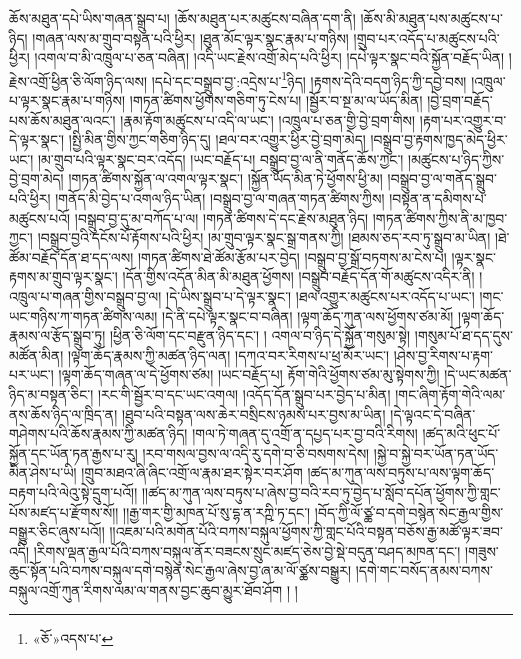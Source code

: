 ཆོས་མཐུན་དཔེ་ཡིས་གཞན་སྒྲུབ་པ། །ཆོས་མཐུན་པར་མཚུངས་བཞིན་དག་ནི། །ཆོས་མི་མཐུན་པས་མཚུངས་པ་ཉིད། །གཞན་ལས་མ་གྲུབ་བསྟན་པའི་ཕྱིར། །ཐུན་མོང་ལྟར་སྣང་རྣམ་པ་གཉིས། །གྲུབ་པར་འདོད་པ་མཚུངས་པའི་ཕྱིར། །འགལ་བ་མི་འཁྲུལ་པ་ཅན་བཞིན། །འདི་ཡང་རྗེས་འགྲོ་མེད་པའི་ཕྱིར། །དཔེ་ལྟར་སྣང་བའི་སྐྱོན་བརྗོད་ཡིན། །རྗེས་འགྲོ་ཕྱིན་ཅི་ལོག་ཉིད་ལས། །དཔེ་དང་བསྒྲུབ་བྱ་:འདྲེས་པ་\footnote{«ཅོ་»འདས་པ་}ཉིད། །རྟགས་དེའི་བདག་ཉིད་ཀྱི་དབྱེ་བས། །འཁྲུལ་པ་ལྟར་སྣང་རྣམ་པ་གཉིས། །གཏན་ཚིགས་ཕྱོགས་གཅིག་ཏུ་ངེས་པ། །སྦྱོར་བ་སྔ་མ་ལ་ཡོད་མིན། །བྱེ་བྲག་བརྗོད་པས་ཆོས་མཐུན་ལའང་། །རྣམ་རྟོག་མཚུངས་པ་འདི་ལ་ཡང་། །འཁྲུལ་པ་ཅན་གྱི་བྱེ་བྲག་གིས། །རྟག་པར་འགྱུར་བ་དེ་ལྟར་སྣང་། །སྤྱི་མིན་གྱིས་ཀྱང་གཅིག་ཉིད་དུ། །ཐལ་བར་འགྱུར་ཕྱིར་བྱེ་བྲག་མེད། །བསྒྲུབ་བྱ་རྟགས་ཁྱད་མེད་ཕྱིར་ཡང་། །མ་གྲུབ་པའི་ལྟར་སྣང་བར་འདོད། །ཡང་བརྗོད་པ། བསྒྲུབ་བྱ་ལ་ནི་གནོད་ཆོས་ཀྱང་། །མཚུངས་པ་ཉིད་ཀྱིས་བྱེ་བྲག་མེད། །གཏན་ཚིགས་སྐྱོན་ལ་འགལ་ལྟར་སྣང་། །སྐྱོན་ཡོད་མིན་ཏེ་ཕྱོགས་ཕྱི་མ། །བསྒྲུབ་བྱ་ལ་གནོད་སྒྲུབ་པའི་ཕྱིར། །གནོད་མི་བྱེད་པ་འགལ་ཉིད་ཡིན། །བསྒྲུབ་བྱ་ལ་གཞན་གཏན་ཚིགས་ཀྱིས། །བསྟན་ན་དམིགས་པ་མཚུངས་པའོ། །བསྒྲུབ་བྱ་དུ་མ་བཀོད་པ་ལ། །གཏན་ཚིགས་དེ་དང་རྗེས་མཐུན་ཉིད། །གཏན་ཚིགས་ཀྱིས་ནི་མ་ཁྱབ་ཀྱང་། །བསྒྲུབ་བྱའི་དངོས་པོ་རྟོགས་པའི་ཕྱིར། །མ་གྲུབ་ལྟར་སྣང་སྒྲ་གནས་ཀྱི། །ཐམས་ཅད་རབ་ཏུ་སྒྲུབ་མ་ཡིན། །ཐེ་ཚོམ་བརྗོད་དོན་ཐ་དད་ལས། །གཏན་ཚིགས་ཐེ་ཚོམ་རྩོམ་པར་བྱེད། །བསྒྲུབ་བྱ་སྒྲོ་བཏགས་མ་ངེས་པ། །ལྟར་སྣང་རྟགས་མ་གྲུབ་ལྟར་སྣང་། །དོན་གྱིས་འདོན་མིན་མི་མཐུན་ཕྱོགས། །བསྒྲུབ་བརྗོད་དོན་གོ་མཚུངས་འདིར་ནི། །འཁྲུལ་པ་གཞན་གྱིས་བསྒྲུབ་བྱ་ལ། །དེ་ཡིས་སྒྲུབ་པ་དེ་ལྟར་སྣང་། །ཐལ་འགྱུར་མཚུངས་པར་འདོད་པ་ཡང་། །གང་ཡང་གཉིས་ཀ་གཏན་ཚིགས་ལམ། །དེ་ནི་དཔེ་ལྟར་སྣང་བ་བཞིན། །ལྟག་ཆོད་ཀུན་ལས་ཕྱོགས་ཙམ་མོ། །ལྟག་ཆོད་རྣམས་ལ་རྩོད་སྒྲུབ་ཏུ། །ཕྱིན་ཅི་ལོག་དང་བརྫུན་ཉིད་དང་། །
འགལ་བ་ཉིད་དེ་སྐྱོན་གསུམ་སྟེ། །གསུམ་པོ་ཐ་དད་དུས་མཚོན་མིན། །ལྟག་ཆོད་རྣམས་ཀྱི་མཚན་ཉིད་ལན། །དཀའ་བར་རིགས་པ་ཕྲ་མོར་ཡང་། །ཤེས་བྱ་རིགས་པ་རྟག་པར་ཡང་། །ལྟག་ཆོད་གཞན་ལ་དེ་ཕྱོགས་ཙམ། །ཡང་བརྗོད་པ། རྟོག་གེའི་ཕྱོགས་ཙམ་མུ་སྟེགས་ཀྱི། །དེ་ཡང་མཚན་ཉིད་མ་བསྟན་ཅིང་། །རང་གི་སྦྱོར་བ་དང་ཡང་འགལ། །འདོད་དོན་སྒྲུབ་པར་བྱེད་པ་མིན། །གང་ཞིག་རྟོག་གེའི་ལམ་ནས་ཆོས་ཉིད་ལ་ཁྲིད་ན། །ཐུབ་པའི་བསྟན་ལས་ཆེར་བསྲིངས་ཉམས་པར་བྱས་མ་ཡིན། །དེ་ལྟའང་དེ་བཞིན་གཤེགས་པའི་ཆོས་རྣམས་ཀྱི་མཚན་ཉིད། །གལ་ཏེ་གཞན་དུ་འགྲོ་ན་དཔྱད་པར་བྱ་བའི་རིགས། །ཚད་མའི་ཕུང་པོ་སྐྱོན་དང་ཡོན་ཏན་རྒྱས་པ་རུ། །རབ་གསལ་བྱས་ལ་འདི་རུ་དགེ་བ་ཅི་བསགས་དེས། །སྐྱེ་བ་སྐྱེ་བར་ཡོན་ཏན་ཡོད་མིན་ཤེས་པ་ཡི། །གྲུབ་མཐའ་ཞི་ཞིང་འགྲོ་ལ་རྣམ་ཐར་སྟེར་བར་ཤོག །ཚད་མ་ཀུན་ལས་བཏུས་པ་ལས་ལྟག་ཆོད་བརྟག་པའི་ལེའུ་སྟེ་དྲུག་པའོ།། །།ཚད་མ་ཀུན་ལས་བཏུས་པ་ཞེས་བྱ་བའི་རབ་ཏུ་བྱེད་པ་སློབ་དཔོན་ཕྱོགས་ཀྱི་གླང་པོས་མཛད་པ་རྫོགས་སོ།། །།རྒྱ་གར་གྱི་མཁན་པོ་སུ་དྷ་ན་རཀྵི་ཏ་དང་། །བོད་ཀྱི་ལོ་ཙྪ་བ་དགེ་བསྙེན་སེང་རྒྱལ་གྱིས་བསྒྱུར་ཅིང་ཞུས་པའོ།། །།འཇམ་པའི་མགོན་པོའི་བཀས་བསྐུལ་ཕྱོགས་ཀྱི་གླང་པོའི་བསྟན་བཅོས་རྒྱ་མཚོ་ལྟར་ཟབ་འདི། །རིགས་ལྡན་རྒྱལ་པོའི་བཀས་བསྐུལ་ནོར་བཟངས་སྲུང་མཛད་ཅེས་བྱེ་སྡེ་བདུན་བཤད་མཁན་དང་། །གཟུས་ཆུང་སྟོན་པའི་བཀས་བསྐུལ་དགེ་བསྙེན་སེང་རྒྱལ་ཞེས་བྱ་ཞ་མ་ལོ་ཙྪས་བསྒྱུར། །དགེ་གང་བསོད་ནམས་བཀས་བསྐུལ་འགྲོ་ཀུན་རིགས་ལམ་ལ་གནས་བྱང་ཆུབ་མྱུར་ཐོབ་ཤོག ། །